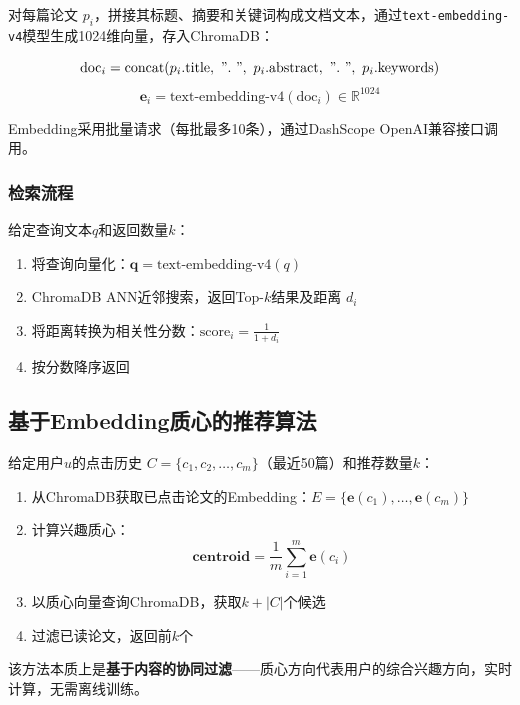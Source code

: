 \documentclass[12pt,a4paper]{ctexart}
\newcommand{\code}[1]{\texttt{#1}}
\begin{document}
对每篇论文 $p_i$，拼接其标题、摘要和关键词构成文档文本，通过\code{text-embedding-v4}模型生成1024维向量，存入ChromaDB：

\begin{equation}
\text{doc}_i = \text{concat}(p_i.\text{title},\ ".\ ",\ p_i.\text{abstract},\ ".\ ",\ p_i.\text{keywords})
\end{equation}
\begin{equation}
\mathbf{e}_i = \text{text-embedding-v4}(\text{doc}_i) \in \mathbb{R}^{1024}
\end{equation}

Embedding采用批量请求（每批最多10条），通过DashScope OpenAI兼容接口调用。

\subsubsection{检索流程}

给定查询文本$q$和返回数量$k$：
\begin{enumerate}
\item 将查询向量化：$\mathbf{q} = \text{text-embedding-v4}(q)$
\item ChromaDB ANN近邻搜索，返回Top-$k$结果及距离 $d_i$
\item 将距离转换为相关性分数：$\text{score}_i = \frac{1}{1 + d_i}$
\item 按分数降序返回
\end{enumerate}

\subsection{基于Embedding质心的推荐算法}

给定用户$u$的点击历史 $C = \{c_1, c_2, \dots, c_m\}$（最近50篇）和推荐数量$k$：

\begin{enumerate}
\item 从ChromaDB获取已点击论文的Embedding：$E = \{\mathbf{e}(c_1), \dots, \mathbf{e}(c_m)\}$
\item 计算兴趣质心：
\begin{equation}
\mathbf{centroid} = \frac{1}{m} \sum_{i=1}^{m} \mathbf{e}(c_i)
\end{equation}
\item 以质心向量查询ChromaDB，获取$k + |C|$个候选
\item 过滤已读论文，返回前$k$个
\end{enumerate}

该方法本质上是\textbf{基于内容的协同过滤}——质心方向代表用户的综合兴趣方向，实时计算，无需离线训练。
\end{document}
